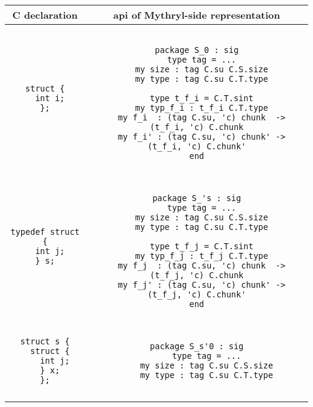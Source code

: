 \begin{small}
\begin{center}
\begin{tabular}{c|c}
C declaration & api of Mythryl-side representation \\ \hline\hline
\begin{minipage}{2in}
\begin{verbatim}
struct {
  int i;
};
\end{verbatim}
\end{minipage}
&
\begin{minipage}{4in}
\begin{verbatim}

package S_0 : sig
  type tag = ...
  my size : tag C.su C.S.size
  my type : tag C.su C.T.type

  type t_f_i = C.T.sint
  my typ_f_i : t_f_i C.T.type
  my f_i  : (tag C.su, 'c) chunk  -> (t_f_i, 'c) C.chunk
  my f_i' : (tag C.su, 'c) chunk' -> (t_f_i, 'c) C.chunk'
end

\end{verbatim}
\end{minipage}  
\\ \hline
\begin{minipage}{2in}
\begin{verbatim}
typedef struct {
  int j;
} s;
\end{verbatim}
\end{minipage}
&
\begin{minipage}{4in}
\begin{verbatim}

package S_'s : sig
  type tag = ...
  my size : tag C.su C.S.size
  my type : tag C.su C.T.type

  type t_f_j = C.T.sint
  my typ_f_j : t_f_j C.T.type
  my f_j  : (tag C.su, 'c) chunk  -> (t_f_j, 'c) C.chunk
  my f_j' : (tag C.su, 'c) chunk' -> (t_f_j, 'c) C.chunk'
end

\end{verbatim}
\end{minipage}  
\\ \hline
\begin{minipage}{2in}
\begin{verbatim}
struct s {
  struct {
    int j;
  } x;
};
\end{verbatim}
\end{minipage}
&
\begin{minipage}{4in}
\begin{verbatim}

package S_s'0 : sig
    type tag = ...
    my size : tag C.su C.S.size
    my type : tag C.su C.T.type


\end{verbatim}
\end{minipage}
\end{tabular}
\end{center}
\end{small}
